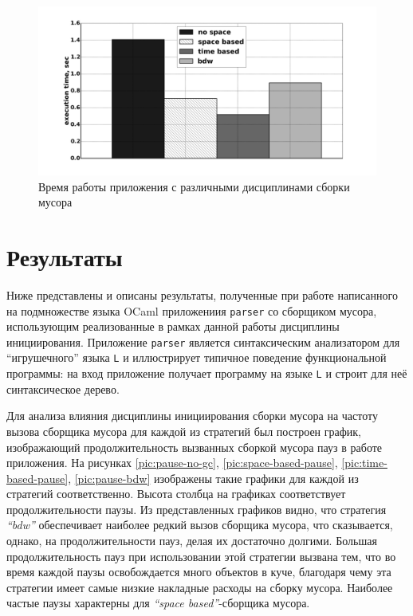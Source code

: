 \begin{figure}[ph]
\caption{\label{pic:perf}Время работы приложения с различными дисциплинами сборки мусора}
\includegraphics[width=1\linewidth]{Bakradze/perf.png}
\end{figure}

\section{Результаты}

Ниже представлены и описаны результаты, полученные при работе написанного на 
подмножестве языка OCaml приложениия \texttt{parser} со сборщиком мусора,
использующим реализованные в рамках данной работы дисциплины инициирования.
Приложение \texttt{parser} является
синтаксическим анализатором для ``игрушечного'' языка \texttt{L} и иллюстрирует типичное
поведение функциональной программы: на вход приложение получает программу на языке 
\texttt{L}
и строит для неё синтаксическое дерево. 


Для анализа влияния дисциплины инициирования сборки мусора на частоту вызова сборщика
мусора для каждой из стратегий был построен график, изображающий продолжительность 
вызванных сборкой мусора пауз в 
работе приложения. На рисунках \ref{pic:pause-no-gc},
\ref{pic:space-based-pause}, \ref{pic:time-based-pause}, \ref{pic:pause-bdw} 
изображены такие графики для каждой из стратегий соответственно. Высота столбца на графиках
соответствует продолжительности паузы. Из представленных графиков видно, что
стратегия \emph{``bdw''} обеспечивает наиболее редкий вызов сборщика мусора, что сказывается,
однако, на продолжительности пауз, делая их достаточно долгими. 
Большая продолжительность пауз при использовании этой стратегии вызвана
тем, что во время каждой паузы освобождается много объектов в куче,
благодаря чему эта стратегии имеет самые низкие накладные расходы на сборку
мусора. Наиболее частые паузы характерны для \emph{``space based''}-сборщика мусора. 


